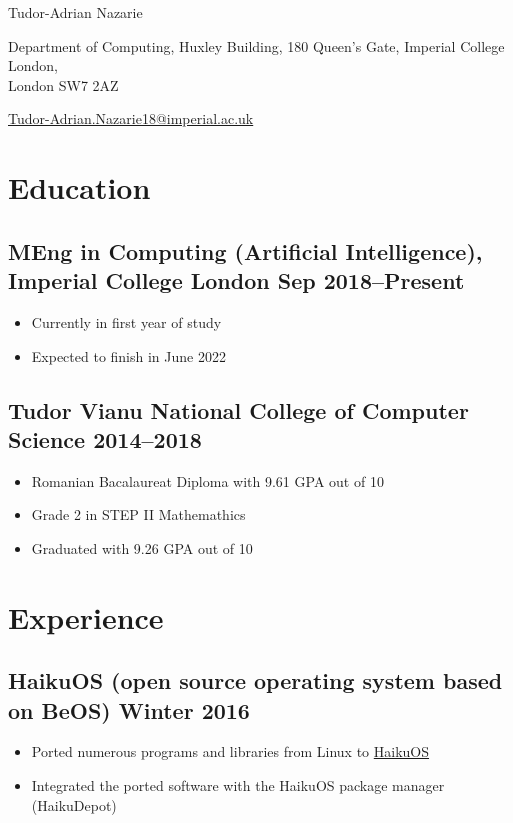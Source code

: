 \documentclass[a4paper]{article}
\begin{document}
\begin{center}
	{\huge\sffamily Tudor-Adrian Nazarie}

	\vspace{4pt}

	Department of Computing, Huxley Building, 180 Queen's Gate, Imperial
	College London,\\ London SW7 2AZ

	\vspace{4pt}

	\href{mailto:tudor-adrian.nazarie18@imperial.ac.uk}{Tudor-Adrian.Nazarie18@imperial.ac.uk}

	\vspace{-12pt}
\end{center}

\section*{Education}
\subsection*{MEng in Computing (Artificial Intelligence), Imperial College
London \hfill Sep 2018--Present}
\begin{itemize}
	\item Currently in first year of study
	\item Expected to finish in June 2022
\end{itemize}

\subsection*{Tudor Vianu National College of Computer Science \hfill
2014--2018}
\begin{itemize}
	\item Romanian Bacalaureat Diploma with 9.61 GPA out of 10
	\item Grade 2 in STEP II Mathemathics
	\item Graduated with 9.26 GPA out of 10
\end{itemize}

\section*{Experience}
\subsection*{HaikuOS (open source operating system based on BeOS) \hfill Winter 2016}
\begin{itemize}
	\item Ported numerous programs and libraries from Linux to \href{https://www.haiku-os.org/}{HaikuOS}
	\item Integrated the ported software with the HaikuOS package manager
		(HaikuDepot)
\end{itemize}
\end{document}
